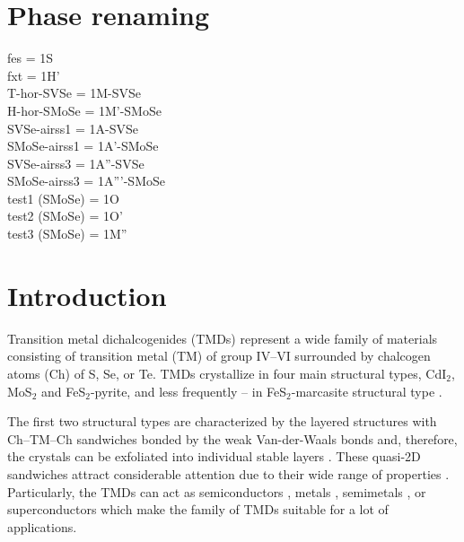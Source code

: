 \documentclass[a4paperm]{article}
\begin{document}
\section*{Phase renaming}
fes = 1S \\
fxt = 1H' \\
T-hor-SVSe = 1M-SVSe \\
H-hor-SMoSe = 1M'-SMoSe \\
SVSe-airss1 = 1A-SVSe \\
SMoSe-airss1 = 1A'-SMoSe \\
SVSe-airss3 = 1A''-SVSe \\
SMoSe-airss3 = 1A'''-SMoSe \\
test1 (SMoSe) = 1O \\
test2 (SMoSe) = 1O' \\
test3 (SMoSe) = 1M'' \\


\section{Introduction}

Transition metal dichalcogenides (TMDs) represent a wide family of materials consisting of transition metal (TM) of group IV--VI surrounded by chalcogen atoms (Ch) of S, Se, or Te. 
TMDs crystallize in four main structural types, CdI$_2$, MoS$_2$ and FeS$_2$-pyrite, and less frequently -- in FeS$_2$-marcasite structural type \cite{wells}.

The first two structural types are characterized by the layered structures with Ch--TM--Ch sandwiches bonded by the weak Van-der-Waals bonds and, therefore, the crystals can be exfoliated into individual stable layers \cite{zhang2020intercalation}. These quasi-2D sandwiches attract considerable attention due to their wide range of properties \cite{li2017graphene, SHI20181, xi2016ising, hu2019recent, pi2019recent}. 
Particularly, the TMDs can act as semiconductors \cite{nayeri2018transport}, metals \cite{zhao20212d}, semimetals \cite{xu2020high, zhao2020observation}, or superconductors \cite{wang2020nodeless,hsu2017topological} which make the family of TMDs suitable for a lot of applications. 
\end{document}
